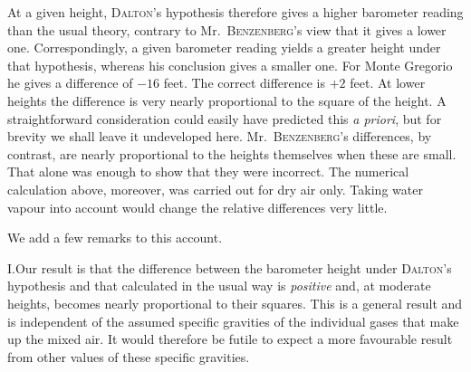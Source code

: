 At a given height, \textsc{Dalton}’s hypothesis therefore gives a higher barometer reading than the usual theory, contrary to Mr.\ \textsc{Benzenberg}’s view that it gives a lower one. Correspondingly, a given barometer reading yields a greater height under that hypothesis, whereas his conclusion gives a smaller one. For Monte Gregorio he gives a difference of $-16$ feet. The correct difference is $+2$ feet. At lower heights the difference is very nearly proportional to the square of the height. A straightforward consideration could easily have predicted this \textit{a priori}, but for brevity we shall leave it undeveloped here. Mr.\ \textsc{Benzenberg}’s differences, by contrast, are nearly proportional to the heights themselves when these are small. That alone was enough to show that they were incorrect. The numerical calculation above, moreover, was carried out for dry air only. Taking water vapour into account would change the relative differences very little.

We add a few remarks to this account.

I.\quad Our result is that the difference between the barometer height under \textsc{Dalton}’s hypothesis and that calculated in the usual way is \textit{positive} and, at moderate heights, becomes nearly proportional to their squares. This is a general result and is independent of the assumed specific gravities of the individual gases that make up the mixed air. It would therefore be futile to expect a more favourable result from other values of these specific gravities.

